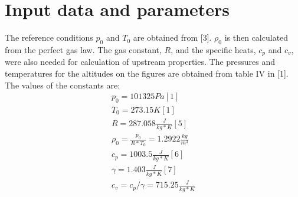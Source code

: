 \documentclass[9pt]{article}
\begin{document}
\section*{Input data and parameters}
The reference conditions $p_0$ and $T_0$ are obtained from [3]. $\rho_0$ is then calculated from the perfect gas law. The gas constant, $R$, and the specific heats, $c_p$ and $c_v$, were also needed for calculation of upstream properties. The pressures and temperatures for the altitudes on the figures are obtained from table IV in [1]. The values of the constants are:
\begin{align*}
p_{0}=101325Pa [1] \\
T_{0}=273.15K [1] \\
R = 287.058\tfrac{J}{kg*K} [5]\\
\rho_{0}=\tfrac{p_{0}}{R*T_{0}}=1.2922\tfrac{kg}{m^{3}} \\
c_p=1003.5\tfrac{J}{kg*K} [6] \\
\gamma=1.403\tfrac{J}{kg*K} [7] \\
c_{v} = c_{p}/\gamma=715.25\tfrac{J}{kg*K}
\end{align*}
\end{document}

